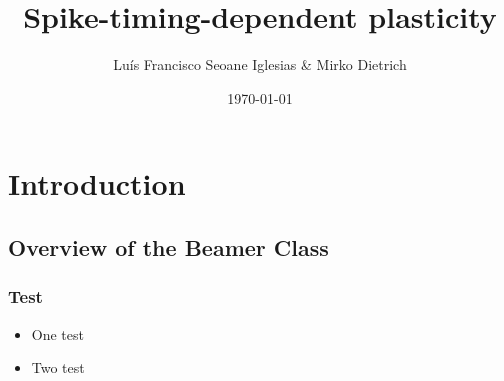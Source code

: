 \documentclass{beamer}
\title{Spike-timing-dependent plasticity}
\author{Lu\'{i}s Francisco Seoane Iglesias \& Mirko Dietrich}
\date{\today}
\begin{document}
\frame{\titlepage}

\section[Outline]{}
\frame{\tableofcontents}

\section{Introduction}
\subsection{Overview of the Beamer Class}
\frame
    {
      \frametitle{Test}

      \begin{itemize}
      \item<1-> One test
      \item<2-> Two test
      \end{itemize}
    }
\end{document}
